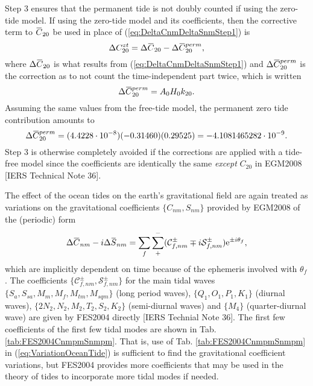 \documentclass[11pt,dvipsnames]{thesis}
\newcommand{\overbar}[1]{\mkern 1.5mu\overline{\mkern-1.5mu#1\mkern-1.5mu}\mkern 1.5mu}
\begin{document}
Step 3 ensures that the permanent tide is not doubly counted if using the zero-tide model. If using the zero-tide model and its coefficients, then the corrective term to $\overbar{C}_{20}$ be used in place of (\ref{eq:DeltaCnmDeltaSnmStep1}) is
\begin{equation}
\Delta C_{20}^{zt} = \Delta\overbar{C}_{20} - \Delta\overbar{C}_{20}^{perm},
\end{equation}
where $\Delta\overbar{C}_{20}$ is what results from (\ref{eq:DeltaCnmDeltaSnmStep1}) and $\Delta\overbar{C}_{20}^{perm}$ is the correction as to not count the time-independent part twice, which is written
\begin{equation}
\Delta\overbar{C}_{20}^{perm} = A_0 H_0 k_{20}. \label{eq:ZeroTideC20Perm}
\end{equation}
Assuming the same values from the free-tide model, the permanent zero tide contribution amounts to
\begin{equation}
\Delta\overbar{C}_{20}^{perm} = (4.4228\cdot 10^{-8}) (-0.31460) (0.29525) = -4.1081465282 \cdot 10^{-9}.
\end{equation}
Step 3 is otherwise completely avoided if the corrections are applied with a tide-free model since the coefficients are identically the same \textit{except} $C_{20}$ in EGM2008 [IERS Technical Note 36].

The effect of the ocean tides on the earth's gravitational field are again treated as variations on the gravitational coefficients $\{C_{nm}, S_{nm}\}$ provided by EGM2008 of the (periodic) form
\begin{equation}
\Delta\overbar{C}_{nm} - i \Delta\overbar{S}_{nm} = \sum_f \sum_+^- (\mathcal{C}_{f,nm}^{\pm} \mp i \mathcal{S}_{f,nm}^{\pm}) \mathrm{e}^{\pm i \theta_f}, \label{eq:VariationOceanTide}
\end{equation}
which are implicitly dependent on time because of the ephemeris involved with $\theta_f$. The coefficients $\{\mathcal{C}_{f,nm}^{\pm}, \mathcal{S}_{f,nm}^{\pm}\}$ for the main tidal waves $\{S_a, S_{sa}, M_m, M_f, M_{tm}, M_{sqm}\}$ (long period waves), $\{Q_1, O_1, P_1, K_1\}$ (diurnal waves), $\{2N_2, N_2, M_2, T_2, S_2, K_2\}$ (semi-diurnal waves) and $\{M_4\}$ (quarter-diurnal wave) are given by FES2004 directly [IERS Technial Note 36]. The first few coefficients of the first few tidal modes are shown in Tab. \ref{tab:FES2004CnmpmSnmpm}.
That is, use of Tab. \ref{tab:FES2004CnmpmSnmpm} in (\ref{eq:VariationOceanTide}) is sufficient to find the gravitational coefficient variations, but FES2004 provides more coefficients that may be used in the theory of tides to incorporate more tidal modes if needed.
\end{document}
